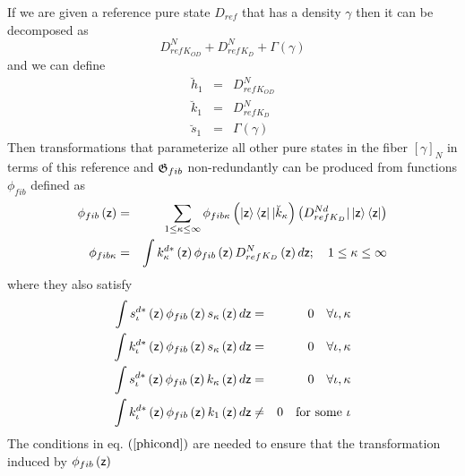 If we are given a reference pure state $D_{ref}$ that has a density $\gamma $
then it can be decomposed as 
\begin{equation}
D_{ref}^{N}{}_{K_{OD}}+D_{ref}^{N}{}_{K_{D}}+\Gamma \left( \gamma \right)
\end{equation}%
and we can define 
\begin{eqnarray}
\breve{h}_{1} &=&D_{ref}^{N}{}_{K_{OD}}  \nonumber \\
\breve{k}_{1} &=&D_{ref}^{N}{}_{K_{D}}  \nonumber \\
\breve{s}_{1} &=&\Gamma \left( \gamma \right)
\end{eqnarray}%
Then transformations that parameterize all other pure states in the fiber $%
\left[ \gamma \right] _{N}$ in terms of this reference and ${\frak G}_{fib}$
non-redundantly can be produced from functions $\phi _{fib}$ defined as 
\begin{eqnarray}
\phi _{fib}\left( {\sf z}\right) &=&\sum_{1\leq \kappa \leq \infty }\phi
_{fib\kappa }\left( \left| {\sf z}\right\rangle \left\langle {\sf z}\right| |%
\breve{k}_{\kappa }\right) \left( D_{refK_{D}}^{Nd}|\left| {\sf z}%
\right\rangle \left\langle {\sf z}\right| \right)  \nonumber \\
\phi _{fib\kappa } &=&\int k_{\kappa }^{d\ast }\left( {\sf z}\right) \phi
_{fib}\left( {\sf z}\right) D_{ref}^{N}{}_{K_{D}}\left( {\sf z}\right) d{\sf %
z};\quad 1\leq \kappa \leq \infty  \label{refkd}
\end{eqnarray}%
where they also satisfy 
\begin{eqnarray}
\int s_{\iota }^{d\ast }\left( {\sf z}\right) \phi _{fib}\left( {\sf z}%
\right) s_{\kappa }\left( {\sf z}\right) d{\sf z} &=&0\quad \forall \iota
,\kappa  \nonumber \\
\int k_{\iota }^{d\ast }\left( {\sf z}\right) \phi _{fib}\left( {\sf z}%
\right) s_{\kappa }\left( {\sf z}\right) d{\sf z} &=&0\quad \forall \iota
,\kappa  \nonumber \\
\int s_{\iota }^{d\ast }\left( {\sf z}\right) \phi _{fib}\left( {\sf z}%
\right) k_{\kappa }\left( {\sf z}\right) d{\sf z} &=&0\quad \forall \iota
,\kappa  \nonumber \\
\int k_{\iota }^{d\ast }\left( {\sf z}\right) \phi _{fib}\left( {\sf z}%
\right) k_{1}\left( {\sf z}\right) d{\sf z} &\neq &0\quad \text{for some }%
\iota  \label{phicond}
\end{eqnarray}%
The conditions in eq. $\left( \ref{phicond}\right) $ are needed to ensure
that the transformation induced by $\phi _{fib}\left( {\sf z}\right) $
